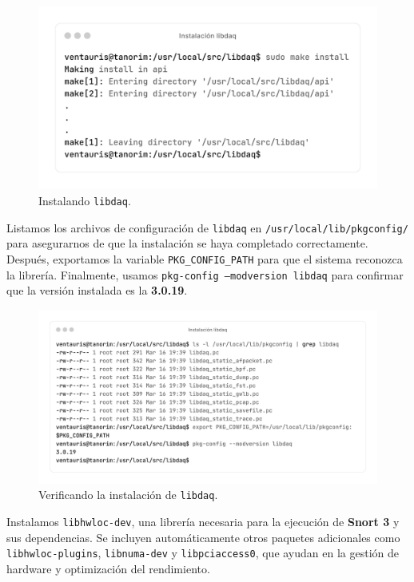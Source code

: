 \documentclass[12pt,a4paper]{report}
\begin{document}
\begin{figure}[H]
	\centering
	\includegraphics[scale=0.12]{instalacion_snort/13-13.png}
	\caption{Instalando \texttt{libdaq}.}
\end{figure}

Listamos los archivos de configuración de \texttt{libdaq} en \texttt{/usr/local/lib/pkgconfig/} para asegurarnos de que la instalación se haya completado correctamente. Después, exportamos la variable \texttt{PKG\_CONFIG\_PATH} para que el sistema reconozca la librería. Finalmente, usamos \texttt{pkg-config --modversion libdaq} para confirmar que la versión instalada es la \textbf{3.0.19}.

\begin{figure}[H]
	\centering
	\includegraphics[scale=0.12]{instalacion_snort/14-14.png}
	\caption{Verificando la instalación de \texttt{libdaq}.}
\end{figure}

\newpage

Instalamos \texttt{libhwloc-dev}, una librería necesaria para la ejecución de \textbf{Snort 3} y sus dependencias. Se incluyen automáticamente otros paquetes adicionales como \texttt{libhwloc-plugins}, \texttt{libnuma-dev} y \texttt{libpciaccess0}, que ayudan en la gestión de hardware y optimización del rendimiento.
\end{document}
